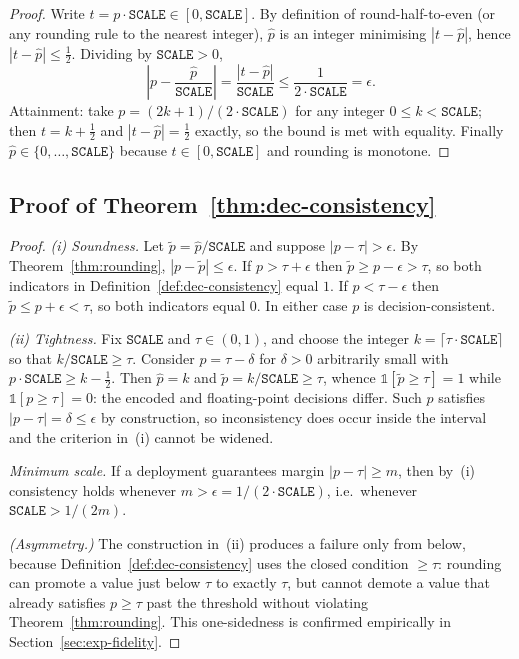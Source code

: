 \documentclass[journal]{IEEEtran}
\theoremstyle{definition}
\theoremstyle{remark}
\begin{document}
\begin{proof}
Write $t=p\cdot\texttt{SCALE}\in[0,\texttt{SCALE}]$. By
definition of round-half-to-even (or any rounding rule to
the nearest integer), $\widehat{p}$ is an integer
minimising $|t-\widehat{p}|$, hence
$|t-\widehat{p}|\le\tfrac12$. Dividing by
$\texttt{SCALE}>0$,
\[
  \left|p-\frac{\widehat{p}}{\texttt{SCALE}}\right|
  = \frac{|t-\widehat{p}|}{\texttt{SCALE}}
  \le \frac{1}{2\cdot\texttt{SCALE}} = \epsilon .
\]
Attainment: take $p=(2k+1)/(2\cdot\texttt{SCALE})$ for any
integer $0\le k<\texttt{SCALE}$; then
$t=k+\tfrac12$ and $|t-\widehat p|=\tfrac12$ exactly, so
the bound is met with equality. Finally
$\widehat{p}\in\{0,\dots,\texttt{SCALE}\}$ because
$t\in[0,\texttt{SCALE}]$ and rounding is monotone.
\end{proof}

\subsection{Proof of Theorem~\ref{thm:dec-consistency}}
\label{app:proof-consistency}

\begin{proof}
\emph{(i) Soundness.} Let
$\tilde{p}=\widehat{p}/\texttt{SCALE}$ and suppose
$|p-\tau|>\epsilon$. By Theorem~\ref{thm:rounding},
$|p-\tilde{p}|\le\epsilon$. If $p>\tau+\epsilon$ then
$\tilde{p}\ge p-\epsilon>\tau$, so both indicators in
Definition~\ref{def:dec-consistency} equal $1$. If
$p<\tau-\epsilon$ then $\tilde{p}\le p+\epsilon<\tau$, so
both indicators equal $0$. In either case $p$ is
decision-consistent.

\emph{(ii) Tightness.} Fix $\texttt{SCALE}$ and
$\tau\in(0,1)$, and choose the integer
$k=\lceil \tau\cdot\texttt{SCALE}\rceil$ so that
$k/\texttt{SCALE}\ge\tau$. Consider
$p=\tau-\delta$ for $\delta>0$ arbitrarily small with
$p\cdot\texttt{SCALE}\ge k-\tfrac12$. Then
$\widehat{p}=k$ and
$\tilde{p}=k/\texttt{SCALE}\ge\tau$, whence
$\mathbb{1}[\tilde{p}\ge\tau]=1$ while
$\mathbb{1}[p\ge\tau]=0$: the encoded and floating-point
decisions differ. Such $p$ satisfies
$|p-\tau|=\delta\le\epsilon$ by construction, so
inconsistency does occur inside the interval and the
criterion in~(i) cannot be widened.

\emph{Minimum scale.} If a deployment guarantees margin
$|p-\tau|\ge m$, then by~(i) consistency holds whenever
$m>\epsilon=1/(2\cdot\texttt{SCALE})$, i.e.\ whenever
$\texttt{SCALE}>1/(2m)$.

\emph{(Asymmetry.)} The construction in~(ii) produces a
failure only from below, because
Definition~\ref{def:dec-consistency} uses the closed
condition $\ge\tau$: rounding can promote a value just
below $\tau$ to exactly $\tau$, but cannot demote a value
that already satisfies $p\ge\tau$ past the threshold
without violating Theorem~\ref{thm:rounding}. This
one-sidedness is confirmed empirically in
Section~\ref{sec:exp-fidelity}.
\end{proof}
\end{document}
